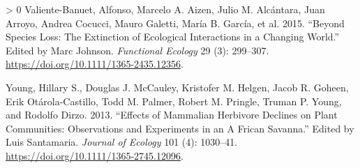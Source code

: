 \documentclass[10pt,oneside]{article}
\newlength{\cslhangindent}
\newenvironment{CSLReferences}[3] %
 {%
  \setlength{\parindent}{0pt}
  \ifodd #1 \everypar{\setlength{\hangindent}{\cslhangindent}}\ignorespaces\fi
  \ifnum #2 > 0
  \setlength{\parskip}{#2\baselineskip}
  \fi
 }%
 {}
\begin{document}
\begin{CSLReferences}{1}{0}
\leavevmode\hypertarget{ref-Valiente-Banuet2015SpeLos}{}%
Valiente-Banuet, Alfonso, Marcelo A. Aizen, Julio M. Alcántara, Juan
Arroyo, Andrea Cocucci, Mauro Galetti, María B. García, et al. 2015.
{``Beyond Species Loss: The Extinction of Ecological Interactions in a
Changing World.''} Edited by Marc Johnson. \emph{Functional Ecology} 29
(3): 299--307. \url{https://doi.org/10.1111/1365-2435.12356}.

\leavevmode\hypertarget{ref-Young2013EffMam}{}%
Young, Hillary S., Douglas J. McCauley, Kristofer M. Helgen, Jacob R.
Goheen, Erik Otárola-Castillo, Todd M. Palmer, Robert M. Pringle, Truman
P. Young, and Rodolfo Dirzo. 2013. {``Effects of Mammalian Herbivore
Declines on Plant Communities: Observations and Experiments in an
\textsc{A} Frican Savanna.''} Edited by Luis Santamaria. \emph{Journal
of Ecology} 101 (4): 1030--41.
\url{https://doi.org/10.1111/1365-2745.12096}.

\end{CSLReferences}
\end{document}
